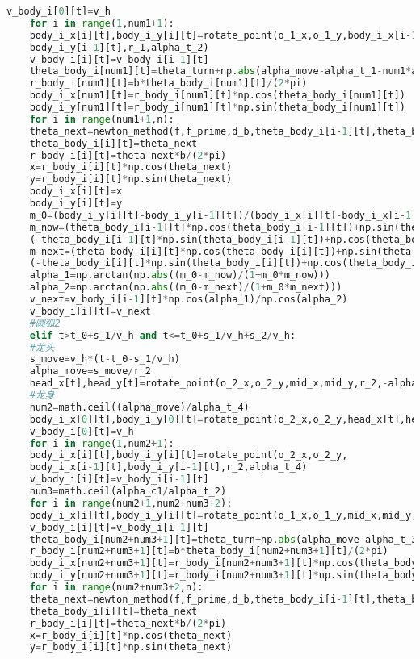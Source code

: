 \documentclass[withoutpreface,bwprint]{cumcmthesis} %
\begin{document}
\begin{lstlisting}[language=Python]
	v_body_i[0][t]=v_h
	for i in range(1,num1+1):
	body_i_x[i][t],body_i_y[i][t]=rotate_point(o_1_x,o_1_y,body_i_x[i-1][t],
	body_i_y[i-1][t],r_1,alpha_t_2)
	v_body_i[i][t]=v_body_i[i-1][t]
	theta_body_i[num1][t]=theta_turn+np.abs(alpha_move-alpha_t_1-num1*alpha_t_2)
	r_body_i[num1][t]=b*theta_body_i[num1][t]/(2*pi)
	body_i_x[num1][t]=r_body_i[num1][t]*np.cos(theta_body_i[num1][t])
	body_i_y[num1][t]=r_body_i[num1][t]*np.sin(theta_body_i[num1][t])
	for i in range(num1+1,n):
	theta_next=newton_method(f,f_prime,d_b,theta_body_i[i-1][t],theta_body_i[i-1][t]+pi/2)
	theta_body_i[i][t]=theta_next
	r_body_i[i][t]=theta_next*b/(2*pi)
	x=r_body_i[i][t]*np.cos(theta_next)
	y=r_body_i[i][t]*np.sin(theta_next)
	body_i_x[i][t]=x
	body_i_y[i][t]=y
	m_0=(body_i_y[i][t]-body_i_y[i-1][t])/(body_i_x[i][t]-body_i_x[i-1][t])
	m_now=(theta_body_i[i-1][t]*np.cos(theta_body_i[i-1][t])+np.sin(theta_body_i[i-1][t]))/
	(-theta_body_i[i-1][t]*np.sin(theta_body_i[i-1][t])+np.cos(theta_body_i[i-1][t]))
	m_next=(theta_body_i[i][t]*np.cos(theta_body_i[i][t])+np.sin(theta_body_i[i][t]))/
	(-theta_body_i[i][t]*np.sin(theta_body_i[i][t])+np.cos(theta_body_i[i][t]))
	alpha_1=np.arctan(np.abs((m_0-m_now)/(1+m_0*m_now)))
	alpha_2=np.arctan(np.abs((m_0-m_next)/(1+m_0*m_next)))
	v_next=v_body_i[i-1][t]*np.cos(alpha_1)/np.cos(alpha_2)
	v_body_i[i][t]=v_next
	#圆弧2
	elif t>t_0+s_1/v_h and t<=t_0+s_1/v_h+s_2/v_h:
	#龙头
	s_move=v_h*(t-t_0-s_1/v_h)
	alpha_move=s_move/r_2
	head_x[t],head_y[t]=rotate_point(o_2_x,o_2_y,mid_x,mid_y,r_2,-alpha_move)
	#龙身
	num2=math.ceil((alpha_move)/alpha_t_4)
	body_i_x[0][t],body_i_y[0][t]=rotate_point(o_2_x,o_2_y,head_x[t],head_y[t],r_2,alpha_t_3)
	v_body_i[0][t]=v_h
	for i in range(1,num2+1):
	body_i_x[i][t],body_i_y[i][t]=rotate_point(o_2_x,o_2_y,
	body_i_x[i-1][t],body_i_y[i-1][t],r_2,alpha_t_4)
	v_body_i[i][t]=v_body_i[i-1][t]
	num3=math.ceil(alpha_c1/alpha_t_2)
	for i in range(num2+1,num2+num3+2):
	body_i_x[i][t],body_i_y[i][t]=rotate_point(o_1_x,o_1_y,mid_x,mid_y,r_1,alpha_t_2)
	v_body_i[i][t]=v_body_i[i-1][t]
	theta_body_i[num2+num3+1][t]=theta_turn+np.abs(alpha_move-alpha_t_3-num2*alpha_t_4)
	r_body_i[num2+num3+1][t]=b*theta_body_i[num2+num3+1][t]/(2*pi)
	body_i_x[num2+num3+1][t]=r_body_i[num2+num3+1][t]*np.cos(theta_body_i[num2+num3+1][t])
	body_i_y[num2+num3+1][t]=r_body_i[num2+num3+1][t]*np.sin(theta_body_i[num2+num3+1][t])
	for i in range(num2+num3+2,n):
	theta_next=newton_method(f,f_prime,d_b,theta_body_i[i-1][t],theta_body_i[i-1][t]+pi/2)
	theta_body_i[i][t]=theta_next
	r_body_i[i][t]=theta_next*b/(2*pi)
	x=r_body_i[i][t]*np.cos(theta_next)
	y=r_body_i[i][t]*np.sin(theta_next)

\end{lstlisting}
\end{document}
